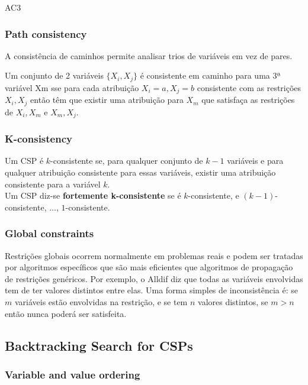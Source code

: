 \documentclass[11pt]{article}
\begin{document}
AC3

\subsubsection{Path consistency}

A consistência de caminhos permite analisar trios de variáveis em vez de pares.\vspace{4pt}

Um conjunto de 2 variáveis $\{X_i, X_j\}$ é consistente em caminho para uma 3ª variável Xm sse para cada atribuição ${X_i = a, X_j = b}$ consistente com as restrições ${X_i, X_j}$ então têm que existir uma atribuição para $X_m$ que satisfaça as restrições de ${X_i, X_m}$ e ${X_m, X_j}$.

\subsubsection{K-consistency}

Um CSP é $k$-consistente se, para qualquer conjunto de $k-1$ variáveis e para qualquer atribuição consistente para essas variáveis, existir uma atribuição consistente para a variável $k$.\\
Um CSP diz-se \textbf{fortemente k-consistente} se é $k$-consistente, e $(k-1)$-consistente, $\ldots$, $1$-consistente.

\subsubsection{Global constraints}

Restrições globais ocorrem normalmente em problemas reais e podem ser tratadas por algoritmos específicos que são mais eficientes que algoritmos de propagação de restrições genéricos. Por exemplo, o Alldif diz que todas as variáveis envolvidas tem de ter valores distintos entre elas. Uma forma simples de inconsistência é: se $m$ variáveis estão envolvidas na restrição, e se tem $n$ valores distintos, se $m > n$ então nunca poderá ser satisfeita.

\subsection{Backtracking Search for CSPs}


\subsubsection{Variable and value ordering}
\end{document}
